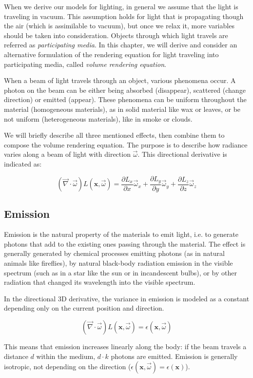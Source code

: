 When we derive our models for lighting, in general we assume that the light is traveling in vacuum. This assumption holds for light that is propagating though the air (which is assimilable to vacuum), but once we relax it, more variables should be taken into consideration. Objects through which light travels are referred as \emph{participating media}. In this chapter, we will derive and consider an alternative formulation of the rendering equation for light traveling into participating media, called \emph{volume rendering equation}.

When a beam of light travels through an object, various phenomena occur. A photon on the beam can be either being absorbed (disappear), scattered (change direction) or emitted (appear). These phenomena can be uniform throughout the material (homogeneous materials), as in solid material like wax or leaves, or be not uniform (heterogeneous materials), like in smoke or clouds.

We will briefly describe all three mentioned effects, then combine them to compose the volume rendering equation. The purpose is to describe how radiance varies along a beam of light with direction $\vec{\omega}$. This directional derivative is indicated as:

$$
(\vec{\nabla} \cdot \vec{\omega}) L(\mathbf{x}, \vec{\omega}) = \frac{\partial L_x}{\partial x} \vec{\omega}_x + \frac{\partial L_y}{\partial y} \vec{\omega}_y +\frac{\partial L_z}{\partial z} \vec{\omega}_z
$$ 

\subsection{Emission}
Emission is the natural property of the materials to emit light, i.e. to generate photons that add to the existing ones passing through the material. The effect is generally generated by chemical processes emitting photons (as in natural animals like fireflies), by natural black-body radiation emission in the visible spectrum (such as in a star like the sun or in incandescent bulbs), or by other radiation that changed its wavelength into the visible spectrum.

In the directional 3D derivative, the variance in emission is modeled as a constant depending only on the current position and direction.

$$
(\vec{\nabla} \cdot \vec{\omega}) L(\mathbf{x}, \vec{\omega}) = \epsilon(\mathbf{x}, \vec{\omega})
$$

This means that emission increases linearly along the body: if the beam travels a distance $d$ within the medium, $d \cdot k$ photons are emitted. Emission is generally isotropic, not depending on the direction ($ \epsilon(\mathbf{x}, \vec{\omega}) =  \epsilon(\mathbf{x})$).

